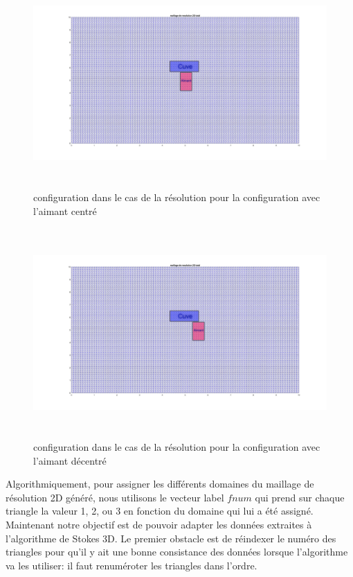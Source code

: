 \documentclass[a4paper,12pt,titlepage]{report}
\begin{document}
\begin{onehalfspace}
\begin{figure}[!h]
	\includegraphics[height = 8cm, keepaspectratio]{graphes/maillage_resolution_total_centre.jpg}
	\caption{\label{figure 3 } configuration dans le cas de la résolution pour la configuration avec l'aimant centré}
\end{figure}
\begin{figure}[!h]
	\includegraphics[height = 8cm, keepaspectratio]{graphes/maillage_resolution_total_decentre.jpg}
	\caption{\label{figure 3 } configuration dans le cas de la résolution pour la configuration avec l'aimant décentré}
\end{figure}

\newpage
Algorithmiquement, pour assigner les différents domaines du maillage de résolution 2D généré, nous utilisons le vecteur label $fnum$ qui prend sur chaque triangle la valeur 1, 2, ou 3 en fonction du domaine qui lui a été assigné.
\newline
Maintenant  notre objectif est de pouvoir adapter les données extraites à l'algorithme de Stokes 3D. Le premier obstacle est de réindexer le numéro des triangles pour qu'il y ait une bonne consistance des données lorsque l'algorithme va les utiliser: il faut renuméroter les triangles dans l'ordre. 
\newline  	


\end{onehalfspace}
\end{document}
